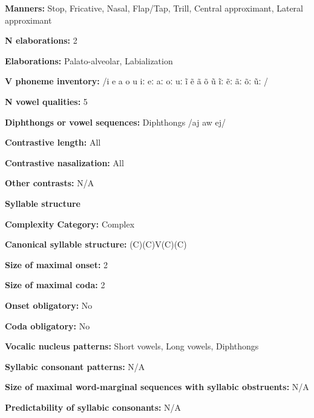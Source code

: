 \textbf{Manners:} Stop, Fricative, Nasal, Flap/Tap, Trill, Central approximant, Lateral approximant



\textbf{N elaborations:} 2



\textbf{Elaborations:} Palato-alveolar, Labialization



\textbf{V phoneme inventory:} /i e a o u iː eː aː oː uː ĩ ẽ ã õ ũ ĩː ẽː ãː õː ũː /



\textbf{N vowel qualities:} 5



\textbf{Diphthongs or vowel sequences:} Diphthongs /aj aw ej/



\textbf{Contrastive length:} All



\textbf{Contrastive nasalization:} All



\textbf{Other contrasts:} N/A



\textbf{Syllable structure}



\textbf{Complexity Category:} Complex



\textbf{Canonical syllable structure:} (C)(C)V(C)(C) \citep[20-21]{Holt1999}



\textbf{Size of maximal onset:} 2



\textbf{Size of maximal coda:} 2



\textbf{Onset obligatory:} No



\textbf{Coda obligatory:} No



\textbf{Vocalic nucleus patterns:} Short vowels, Long vowels, Diphthongs



\textbf{Syllabic consonant patterns:} N/A



\textbf{Size of maximal word{}-marginal sequences with syllabic obstruents:} N/A



\textbf{Predictability of syllabic consonants:} N/A



